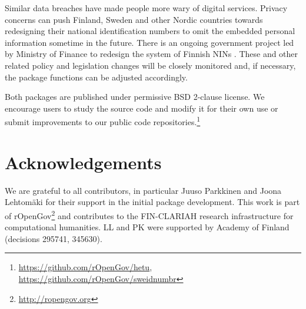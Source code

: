 Similar data breaches have made people more wary of digital services. Privacy concerns can push Finland, Sweden and other Nordic countries towards redesigning their national identification numbers to omit the embedded personal information sometime in the future. There is an ongoing government project led by Ministry of Finance to redesign the system of Finnish NINs \citep{hetuvm}. These and other related policy and legislation changes will be closely monitored and, if necessary, the package functions can be adjusted accordingly.

Both packages are published under permissive BSD 2-clause license. We encourage users to study the source code and modify it for their own use or submit improvements to our public code repositories.\footnote{\url{https://github.com/rOpenGov/hetu}, \url{https://github.com/rOpenGov/sweidnumbr}}

\section{Acknowledgements}

We are grateful to all contributors, in particular Juuso Parkkinen and Joona Lehtomäki for their support in the initial package development. This work is part of rOpenGov\footnote{\url{http://ropengov.org}} and contributes to the FIN-CLARIAH research infrastructure for computational humanities. LL and PK were supported by Academy of Finland (decisions 295741, 345630).



\address{Pyry Kantanen\\
  Department of Computing\\
  PO Box 20014 University of Turku\\
  Finland\\
  ORCiD: 0000-0003-2853-2765\\
  }
  
\address{Måns Magnusson\\
  Department of Statistics\\
  Uppsala University\\
  Sweden\\
  ORCiD: 0000-0002-0296-2719\\
  }

\address{Leo Lahti\\
  Department of Computing\\
  PO Box 20014 University of Turku\\
  Finland\\
  ORCiD: 0000-0001-5537-637X\\
  }